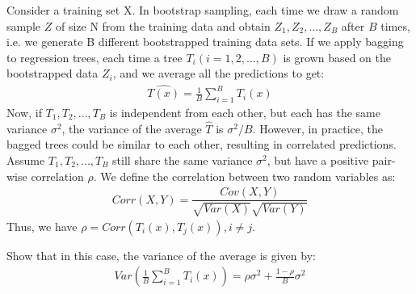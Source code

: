 \item {} 
Consider a training set X. In bootstrap sampling, each time we draw a random sample $Z$ of size N from the training data and obtain ${Z_1, Z_2, ..., Z_B}$ after $B$ times, i.e. we generate B different bootstrapped training data sets. If we apply bagging to regression trees, each time a tree $T_i (i = 1,2,...,B)$ is grown based on the bootstrapped data $Z_i$, and we average all the predictions to get:
\begin{align*}
    \hat{T(x)} =  \frac{1}{B}\sum_{i=1}^{B} T_i(x)
\end{align*}
Now, if $T_1, T_2,..., T_B$ is independent from each other, but each has the same variance $\sigma^2$, the variance of the average $\hat{T}$ is $\sigma^2/B$. However, in practice, the bagged trees could be similar to each other, resulting in correlated predictions. Assume $T_1, T_2,..., T_B$ still share the same variance $\sigma^2$, but have a positive pair-wise correlation $\rho$. We define the correlation between two random variables as:\\
\begin{align*}
    Corr(X,Y)=\dfrac{Cov(X,Y)}{\sqrt{Var(X)}\sqrt{Var(Y)}}
\end{align*}
Thus, we have $\rho = Corr(T_i(x), T_j(x)), i \neq j$.

Show that in this case, the variance of the average is given by:
\begin{align*}
    Var(\frac{1}{B}\sum_{i=1}^{B} T_i(x)) = \rho \sigma^2 + \frac{1-\rho}{B} \sigma^2
\end{align*}